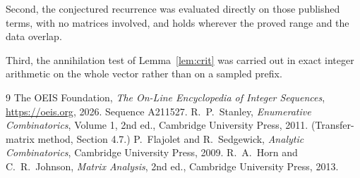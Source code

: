 \documentclass[11pt,a4paper]{article}
\theoremstyle{plain}
\theoremstyle{definition}
\begin{document}
Second, the conjectured recurrence was evaluated directly on those published terms, with no
matrices involved, and holds wherever the proved range and the data overlap.

Third, the annihilation test of Lemma~\ref{lem:crit} was carried out in exact integer
arithmetic on the whole vector rather than on a sampled prefix.

\begin{thebibliography}{9}
 The OEIS Foundation, \emph{The On-Line Encyclopedia of Integer
Sequences}, \url{https://oeis.org}, 2026. Sequence A211527.
 R.~P.~Stanley, \emph{Enumerative Combinatorics}, Volume 1, 2nd ed.,
Cambridge University Press, 2011. (Transfer-matrix method, Section 4.7.)
 P.~Flajolet and R.~Sedgewick, \emph{Analytic Combinatorics}, Cambridge
University Press, 2009.
 R.~A.~Horn and C.~R.~Johnson, \emph{Matrix Analysis}, 2nd ed., Cambridge
University Press, 2013.
\end{thebibliography}
\end{document}
